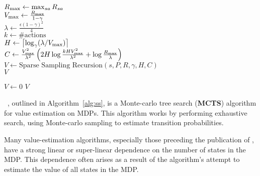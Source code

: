 \begin{algorithm}[tb]
	\caption{$\mbox{Sparse~Sampling}(s, P, R, \gamma, \epsilon, \delta)$}
	\label{alg:ss}
	$R_{\rm max} \leftarrow \max_{sa}R_{sa}$\\
	$V_{\rm max} \leftarrow \frac{R_{\rm max}}{1-\gamma}$\\
	$\lambda \leftarrow \frac{\epsilon(1-\gamma)^2} 4$\\
	$k \leftarrow \#\mbox{actions}$\\
	$H \leftarrow \left\lceil\log_\gamma(\lambda/V_{\rm max})\right\rceil$\\
	$C \leftarrow \frac {V_{\rm max}^2}{\lambda^2}\left(2H\log\frac{kHV_{\rm max}^2}{\lambda^2}+\log\frac{R_{\rm max}}{\lambda}\right)$\\
	$V \leftarrow \mbox{Sparse~Sampling~Recursion}(s, P, R, \gamma, H, C)$\\
	\Return $V$
\end{algorithm}

\begin{algorithm}[tb]
	\caption{$\mbox{Sparse~Sampling~Recursion}(s, P, R, \gamma, d, C)$}
	\label{alg:ssr}
	 {
		$V \leftarrow 0$
	}
	\Return $V$
\end{algorithm}

~\cite{kearns99}, outlined in Algorithm~\ref{alg:ss}, is a Monte-carlo tree search ({\bf MCTS}) algorithm  for value estimation on MDPs.  This algorithm works by performing exhaustive search, using Monte-carlo sampling to estimate transition probabilities. 

Many value-estimation algorithms, especially those preceding the publication of , have a strong linear or super-linear dependence on the number of states in the MDP. This dependence often arises as a result of the algorithm's attempt to estimate the value of all states in the MDP.

